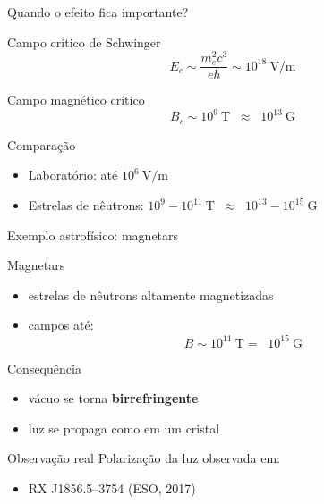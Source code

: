 \documentclass[aspectratio=169]{beamer}
\begin{document}
\begin{frame}{Quando o efeito fica importante?}

\begin{block}{Campo crítico de Schwinger}
\begin{equation}
E_c \sim \frac{m_e^2 c^3}{e\hbar} \sim 10^{18}\ \text{V/m}
\end{equation}
\end{block}

\pause

\begin{block}{Campo magnético crítico}
\begin{equation}
B_c \sim 10^9\ \text{T} \;\; \approx \;\; 10^{13}\ \text{G}
\end{equation}
\end{block}

\pause

\begin{alertblock}{Comparação}
\begin{itemize}
\item Laboratório: até \(10^6\ \text{V/m}\)
\item Estrelas de nêutrons: \(10^{9} - 10^{11}\ \text{T} \;\; \approx \;\; 10^{13} - 10^{15}\ \text{G}\)
\end{itemize}
\end{alertblock}
\end{frame}


\begin{frame}{Exemplo astrofísico: magnetars}

\begin{block}{Magnetars}
\begin{itemize}
\item estrelas de nêutrons altamente magnetizadas
\item campos até:
\[
B \sim 10^{11}\ \text{T} =  \;\;  10^{15}\ \text{G}
\]
\end{itemize}
\end{block}

\pause

\begin{alertblock}{Consequência}
\begin{itemize}
\item vácuo se torna \textbf{birrefringente}
\item luz se propaga como em um cristal
\end{itemize}
\end{alertblock}

\pause

\begin{block}{Observação real}
Polarização da luz observada em:
\begin{itemize}
\item RX J1856.5–3754 (ESO, 2017)
\end{itemize}
\end{block}

\end{frame}
\end{document}
